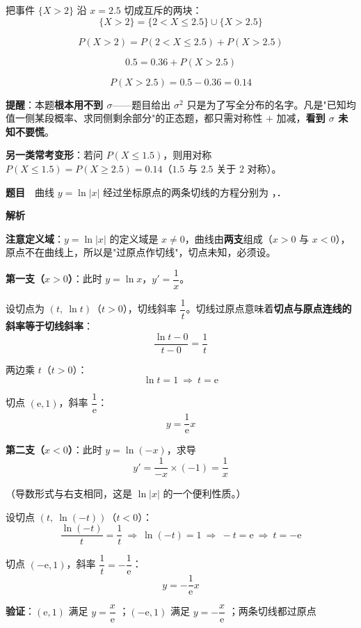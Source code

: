 把事件 $\{X>2\}$ 沿 $x=2.5$ 切成互斥的两块：
\[\{X>2\}=\{2<X\le2.5\}\cup\{X>2.5\}\]

\[P(X>2)=P(2<X\le2.5)+P(X>2.5)\]

\[0.5=0.36+P(X>2.5)\]

\[P(X>2.5)=0.5-0.36=0.14\]


\begin{gktip}
\textbf{提醒}：本题\textbf{根本用不到 $\sigma$}——题目给出 $\sigma^{2}$ 只是为了写全分布的名字。凡是"已知均值一侧某段概率、求同侧剩余部分"的正态题，都只需对称性 $+$ 加减，\textbf{看到 $\sigma$ 未知不要慌}。

\textbf{另一类常考变形}：若问 $P(X\le1.5)$，则用对称 $P(X\le1.5)=P(X\ge2.5)=0.14$（$1.5$ 与 $2.5$ 关于 $2$ 对称）。
\end{gktip}

\par\medskip


\textbf{题目}　曲线 $y=\ln|x|$ 经过坐标原点的两条切线的方程分别为 \gkblank{}，\gkblank{}．

\textbf{解析}

\textbf{注意定义域}：$y=\ln|x|$ 的定义域是 $x\ne0$，曲线由\textbf{两支}组成（$x>0$ 与 $x<0$），原点不在曲线上，所以是"过原点作切线"，切点未知，必须设。

\textbf{第一支（$x>0$）}：此时 $y=\ln x$，$y'=\dfrac1x$。

设切点为 $\left(t,\ \ln t\right)$（$t>0$），切线斜率 $\dfrac1t$。切线过原点意味着\textbf{切点与原点连线的斜率等于切线斜率}：
\[\frac{\ln t-0}{t-0}=\frac1t\]

两边乘 $t$（$t>0$）：
\[\ln t=1\ \Longrightarrow\ t=\mathrm e\]

切点 $(\mathrm e,1)$，斜率 $\dfrac1{\mathrm e}$：
\[y=\frac1{\mathrm e}x\]

\textbf{第二支（$x<0$）}：此时 $y=\ln(-x)$，求导
\[y'=\frac1{-x}\times(-1)=\frac1x\]

（导数形式与右支相同，这是 $\ln|x|$ 的一个便利性质。）

设切点 $\left(t,\ \ln(-t)\right)$（$t<0$）：
\[\frac{\ln(-t)}{t}=\frac1t\ \Longrightarrow\ \ln(-t)=1\ \Longrightarrow\ -t=\mathrm e\ \Longrightarrow\ t=-\mathrm e\]

切点 $(-\mathrm e,1)$，斜率 $\dfrac1t=-\dfrac1{\mathrm e}$：
\[y=-\frac1{\mathrm e}x\]

\textbf{验证}：$(\mathrm e,1)$ 满足 $y=\dfrac x{\mathrm e}$ ；$(-\mathrm e,1)$ 满足 $y=-\dfrac x{\mathrm e}$ ；两条切线都过原点 


